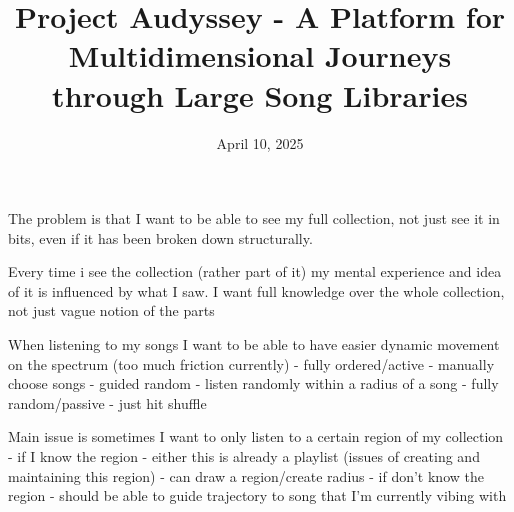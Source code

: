 \documentclass{src/ecsgdp}
\begin{document}
\frontmatter
\title{Project Audyssey - A Platform for Multidimensional Journeys through Large Song Libraries}
\date       {April 10, 2025}
\maketitle

\begin{abstract}

\end{abstract}



\tableofcontents
\listoffigures
\listoftables
\lstlistoflistings



\mainmatter



The problem is that I want to be able to see my full collection, not just see it in bits, even if it has been broken down structurally.

Every time i see the collection (rather part of it) my mental experience and idea of it is influenced by what I saw. I want full knowledge over the whole collection, not just vague notion of the parts

When listening to my songs I want to be able to have easier dynamic movement on the spectrum (too much friction currently)
- fully ordered/active - manually choose songs
- guided random - listen randomly within a radius of a song
- fully random/passive - just hit shuffle

Main issue is sometimes I want to only listen to a certain region of my collection
- if I know the region
    - either this is already a playlist (issues of creating and maintaining this region)
    - can draw a region/create radius
- if don't know the region - should be able to guide trajectory to song that I'm currently vibing with
\end{document}
